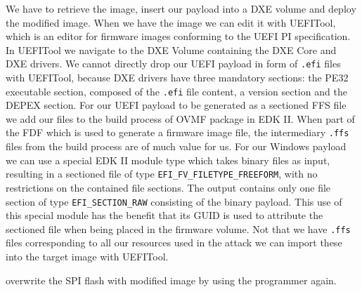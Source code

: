 We have to retrieve the image, insert our payload into a \ac{DXE} volume and deploy the modified image.
When we have the image we can edit it with UEFITool, which is an editor for firmware images conforming to the \ac{UEFI} \ac{PI} specification\cite{uefitool}.
In UEFITool we navigate to the \ac{DXE} Volume containing the \ac{DXE} Core and \ac{DXE} drivers.
We cannot directly drop our \ac{UEFI} payload in form of \lstinline{.efi} files with UEFITool, because \ac{DXE} drivers have three mandatory sections: the \ac{PE32} executable section, composed of the \lstinline{.efi} file content, a version section and the \ac{DEPEX} section\cite[Vol 3, 2.1.4.1.4]{pi-spec}.
For our \ac{UEFI} payload to be generated as a sectioned \ac{FFS} file we add our files to the build process of \ac{OVMF} package in \ac{EDK} II. When part of the \ac{FDF} which is used to generate a firmware image file, the intermediary \lstinline{.ffs} files from the build process are of much value for us.
For our Windows payload we can use a special \ac{EDK} II module type which takes binary files as input, resulting in a sectioned file of type \lstinline{EFI_FV_FILETYPE_FREEFORM}, with no restrictions on the contained file sections\cite[Vol 3, 2.1.4.1.7]{pi-spec}.
The output contains only one file section of type \lstinline{EFI_SECTION_RAW} consisting of the binary payload.
This use of this special module has the benefit that its \ac{GUID} is used to attribute the sectioned file when being placed in the firmware volume.
Not that we have \lstinline{.ffs} files corresponding to all our resources used in the attack we can import these into the target image with UEFITool.

overwrite the SPI flash with modified image by using the programmer again.
